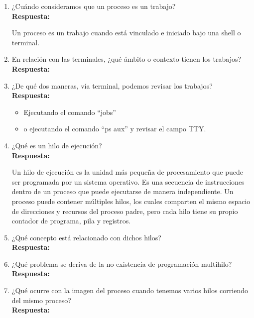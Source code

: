 \documentclass[a4paper,12pt]{article}
\begin{document}
\begin{enumerate}[label=\textbf{Pregunta \arabic*.}]
    \item ¿Cuándo consideramos que un proceso es un trabajo? \\
    \textbf{Respuesta:} 
    
    Un proceso es un trabajo cuando está vinculado e iniciado bajo una shell o terminal. 


    \item En relación con las terminales, ¿qué ámbito o contexto tienen los trabajos? \\ %
    \textbf{Respuesta:} 


    

    \item ¿De qué dos maneras, vía terminal, podemos revisar los trabajos? \\
    \textbf{Respuesta:} 
    
    \begin{itemize}
        \item Ejecutando el comando “jobs”

        \item o ejecutando el comando “ps aux” y revisar el campo TTY.
    \end{itemize}

    \item ¿Qué es un hilo de ejecución? \\ %
    \textbf{Respuesta:} 
    
    Un hilo de ejecución es la unidad más pequeña de procesamiento que puede ser programada por un sistema operativo. Es una secuencia de instrucciones dentro de un proceso que puede ejecutarse de manera independiente. Un proceso puede contener múltiples hilos, los cuales comparten el mismo espacio de direcciones y recursos del proceso padre, pero cada hilo tiene su propio contador de programa, pila y registros.

    \item ¿Qué concepto está relacionado con dichos hilos? \\
    \textbf{Respuesta:} 
    


    \item ¿Qué problema se deriva de la no existencia de programación multihilo? \\
    \textbf{Respuesta:} 
    

    \item ¿Qué ocurre con la imagen del proceso cuando tenemos varios hilos corriendo del mismo proceso? \\
    \textbf{Respuesta:} 
    


\end{enumerate}
\end{document}
